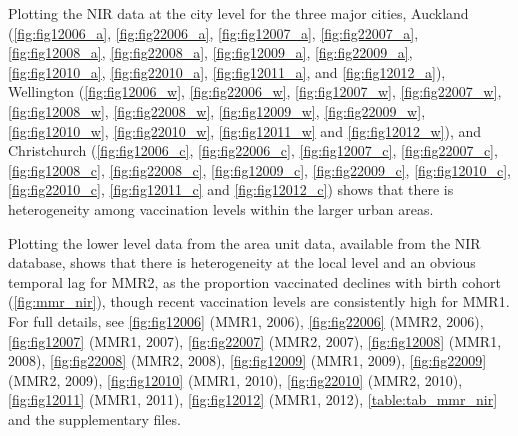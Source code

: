 \documentclass{article}
\begin{document}
Plotting the NIR data at the city level for the three major cities, Auckland (\autoref{fig:fig12006_a}, \autoref{fig:fig22006_a}, \autoref{fig:fig12007_a}, \autoref{fig:fig22007_a}, \autoref{fig:fig12008_a}, \autoref{fig:fig22008_a}, \autoref{fig:fig12009_a}, \autoref{fig:fig22009_a}, \autoref{fig:fig12010_a}, \autoref{fig:fig22010_a}, \autoref{fig:fig12011_a}, and \autoref{fig:fig12012_a}), Wellington (\autoref{fig:fig12006_w}, \autoref{fig:fig22006_w}, \autoref{fig:fig12007_w}, \autoref{fig:fig22007_w}, \autoref{fig:fig12008_w}, \autoref{fig:fig22008_w}, \autoref{fig:fig12009_w}, \autoref{fig:fig22009_w}, \autoref{fig:fig12010_w}, \autoref{fig:fig22010_w}, \autoref{fig:fig12011_w} and \autoref{fig:fig12012_w}), and Christchurch (\autoref{fig:fig12006_c}, \autoref{fig:fig22006_c}, \autoref{fig:fig12007_c}, \autoref{fig:fig22007_c}, \autoref{fig:fig12008_c}, \autoref{fig:fig22008_c}, \autoref{fig:fig12009_c}, \autoref{fig:fig22009_c}, \autoref{fig:fig12010_c}, \autoref{fig:fig22010_c}, \autoref{fig:fig12011_c} and \autoref{fig:fig12012_c}) shows that there is heterogeneity among vaccination levels within the larger urban areas.


Plotting the lower level data from the area unit data, available from the NIR database, shows that there is heterogeneity at the local level and an obvious temporal lag for MMR2, as the proportion vaccinated declines with birth cohort (\autoref{fig:mmr_nir}), though recent vaccination levels are consistently high for MMR1. For full details, see \autoref{fig:fig12006} (MMR1, 2006), \autoref{fig:fig22006} (MMR2, 2006), \autoref{fig:fig12007} (MMR1, 2007), \autoref{fig:fig22007} (MMR2, 2007), \autoref{fig:fig12008} (MMR1, 2008), \autoref{fig:fig22008} (MMR2, 2008), \autoref{fig:fig12009} (MMR1, 2009), \autoref{fig:fig22009} (MMR2, 2009), \autoref{fig:fig12010} (MMR1, 2010), \autoref{fig:fig22010} (MMR2, 2010), \autoref{fig:fig12011} (MMR1, 2011), \autoref{fig:fig12012} (MMR1, 2012), \autoref{table:tab_mmr_nir} and the supplementary files.
\end{document}
